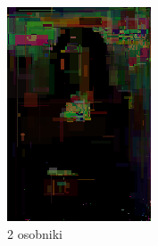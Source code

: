 \begin{figure}[!htb]
    \centering
    \begin{subfigure}[b]{0.3\textwidth}
        \centering
        \label{fig:num_of_best_2}
         \includegraphics[width=\textwidth]{images/mona/num_of_best/2.png}
         \caption{2 osobniki}
    \end{subfigure}
    \begin{subfigure}[b]{0.3\textwidth}
        \centering
        \label{fig:num_of_best_10}

\end{subfigure}
\end{figure}
